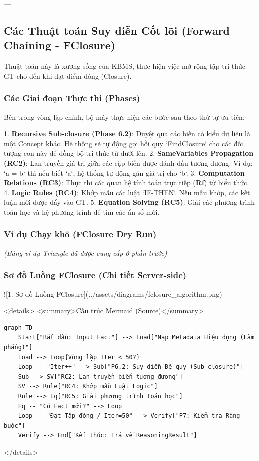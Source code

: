 ---

\subsection{Các Thuật toán Suy diễn Cốt lõi (Forward Chaining - FClosure)}

Thuật toán này là xương sống của KBMS, thực hiện việc mở rộng tập tri thức GT cho đến khi đạt điểm đóng (Closure).

\subsubsection{Các Giai đoạn Thực thi (Phases)}
Bên trong vòng lặp chính, bộ máy thực hiện các bước sau theo thứ tự ưu tiên:

1.  \textbf{Recursive Sub-closure (Phase 6.2)}: Duyệt qua các biến có kiểu dữ liệu là một Concept khác. Hệ thống sẽ tự động gọi hồi quy `FindClosure` cho các đối tượng con này để đồng bộ tri thức từ dưới lên.
2.  \textbf{SameVariables Propagation (RC2)}: Lan truyền giá trị giữa các cặp biến được đánh dấu tương đương. Ví dụ: `a = b` thì nếu biết `a`, hệ thống tự động gán giá trị cho `b`.
3.  \textbf{Computation Relations (RC3)}: Thực thi các quan hệ tính toán trực tiếp (\textbf{Rf}) từ biểu thức.
4.  \textbf{Logic Rules (RC4)}: Khớp mẫu các luật `IF-THEN`. Nếu mẫu khớp, các kết luận mới được đẩy vào GT.
5.  \textbf{Equation Solving (RC5)}: Giải các phương trình toán học và hệ phương trình để tìm các ẩn số mới.

\subsubsection{Ví dụ Chạy khô (FClosure Dry Run)}
\textit{(Bảng ví dụ Triangle đã được cung cấp ở phần trước)}

\subsubsection{Sơ đồ Luồng FClosure (Chi tiết Server-side)}

![1. Sơ đồ Luồng FClosure](../assets/diagrams/fclosure\_algorithm.png)

<details>
<summary>Cấu trúc Mermaid (Source)</summary>

\begin{verbatim}
graph TD
    Start["Bắt đầu: Input Fact"] --> Load["Nạp Metadata Hiệu dụng (Làm phẳng)"]
    Load --> Loop{Vòng lặp Iter < 50?}
    Loop -- "Iter++" --> Sub["P6.2: Suy diễn Đệ quy (Sub-closure)"]
    Sub --> SV["RC2: Lan truyền biến tương đương"]
    SV --> Rule["RC4: Khớp mẫu Luật Logic"]
    Rule --> Eq["RC5: Giải phương trình Toán học"]
    Eq -- "Có Fact mới?" --> Loop
    Loop -- "Đạt Tập đóng / Iter=50" --> Verify["P7: Kiểm tra Ràng buộc"]
    Verify --> End["Kết thúc: Trả về ReasoningResult"]
\end{verbatim}
</details>

